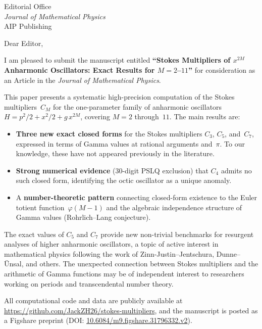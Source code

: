 \documentclass[12pt]{letter}
\date{\today}
\begin{document}
\begin{letter}{Editorial Office\\
\textit{Journal of Mathematical Physics}\\
AIP Publishing}

\opening{Dear Editor,}

I am pleased to submit the manuscript entitled
\textbf{``Stokes Multipliers of $x^{2M}$ Anharmonic Oscillators:
Exact Results for $M = 2$--$11$''}
for consideration as an Article in the \textit{Journal of Mathematical Physics}.

This paper presents a systematic high-precision computation of the
Stokes multipliers~$C_M$ for the one-parameter family of anharmonic
oscillators $H = p^2/2 + x^2/2 + g\,x^{2M}$, covering $M = 2$
through~$11$. The main results are:

\begin{itemize}
\item \textbf{Three new exact closed forms} for the Stokes multipliers
  $C_3$, $C_5$, and~$C_7$, expressed in terms of Gamma values at
  rational arguments and~$\pi$. To our knowledge, these have not
  appeared previously in the literature.

\item \textbf{Strong numerical evidence} (30-digit PSLQ exclusion) that
  $C_4$ admits no such closed form, identifying the octic oscillator as
  a unique anomaly.

\item A \textbf{number-theoretic pattern} connecting closed-form
  existence to the Euler totient function~$\varphi(M{-}1)$ and the
  algebraic independence structure of Gamma values
  (Rohrlich--Lang conjecture).
\end{itemize}

The exact values of $C_5$ and $C_7$ provide new non-trivial benchmarks
for resurgent analyses of higher anharmonic oscillators, a topic of
active interest in mathematical physics following the work of
Zinn-Justin--Jentschura, Dunne--\"Unsal, and others. The unexpected
connection between Stokes multipliers and the arithmetic of Gamma
functions may be of independent interest to researchers working on
periods and transcendental number theory.

All computational code and data are publicly available at
\url{https://github.com/JackZH26/stokes-multipliers}, and the
manuscript is posted as a Figshare preprint
(DOI: \href{https://doi.org/10.6084/m9.figshare.31796332.v2}{10.6084/m9.figshare.31796332.v2}).


\end{letter}
\end{document}
